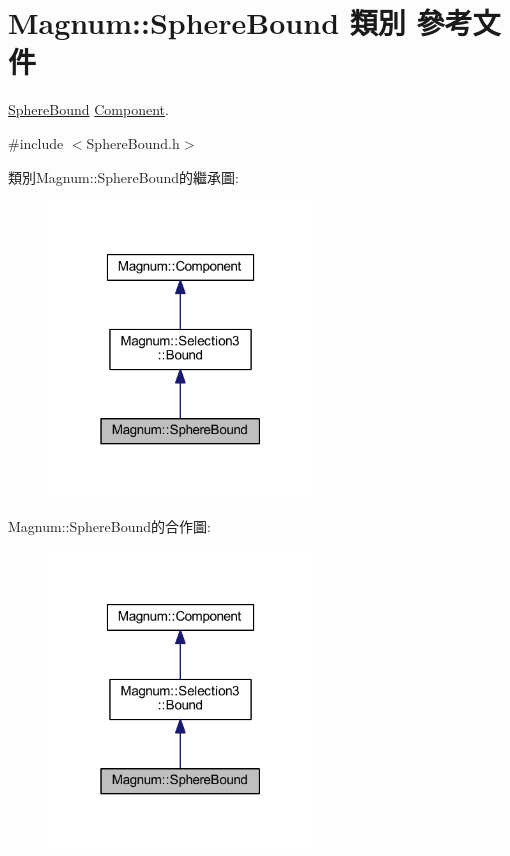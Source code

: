 \hypertarget{class_magnum_1_1_sphere_bound}{}\section{Magnum\+:\+:Sphere\+Bound 類別 參考文件}
\label{class_magnum_1_1_sphere_bound}


\hyperlink{class_magnum_1_1_sphere_bound}{Sphere\+Bound} \hyperlink{class_magnum_1_1_component}{Component}.  




{\ttfamily \#include $<$Sphere\+Bound.\+h$>$}



類別\+Magnum\+:\+:Sphere\+Bound的繼承圖\+:\nopagebreak
\begin{figure}[H]
\begin{center}
\leavevmode
\includegraphics[width=199pt]{class_magnum_1_1_sphere_bound__inherit__graph}
\end{center}
\end{figure}


Magnum\+:\+:Sphere\+Bound的合作圖\+:\nopagebreak
\begin{figure}[H]
\begin{center}
\leavevmode
\includegraphics[width=199pt]{class_magnum_1_1_sphere_bound__coll__graph}
\end{center}
\end{figure}
